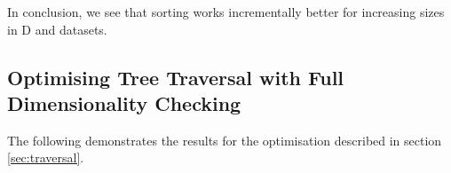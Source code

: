 





In conclusion, we see that sorting works incrementally better for increasing sizes in D and datasets. 


\subsection{Optimising Tree Traversal with Full Dimensionality Checking}

The following demonstrates the results for the optimisation described in section \ref{sec:traversal}. 


